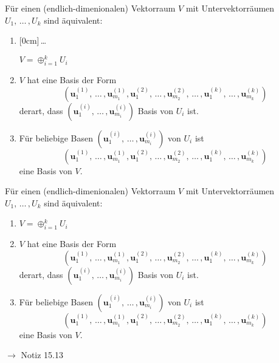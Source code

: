 \documentclass[11pt]{article}
\renewcommand{\cite}[1]{\par\bigskip\hfill{\color{gray}\tiny\(\to\) #1}}
\renewcommand{\vec}[1]{\mathbf{#1}}
\newcommand{\hide}[1]{\parbox{0cm}{\raisebox{-7pt}[0cm]{\dots}}\color{white}#1\color{black}}
\let\olddots\dots
\renewcommand{\dots}{\,\olddots\,}
\newenvironment{field}{}{\newpage}
\newif\ifnote
\newenvironment{note}{\notetrue}{\notefalse}
\newcommand{\localtag}{}
\newcommand{\globaltag}{}
\newcommand{\uuid}{}
\newcommand{\tags}[1]{
    \ifnote
        \renewcommand{\localtag}{#1}
    \else
        \renewcommand{\globaltag}{#1}
    \fi
    }
\newcommand{\xplain}[1]{\renewcommand{\uuid}{#1}}
\begin{document}
\begin{note}
    \tags{Satz}
    \xplain{36322b72-9b20-482b-bf70-882813cdb5db}

    \begin{field}
        \small
        Für einen (endlich-dimenionalen) Vektorraum $V$ mit Untervektorräumen $U_1,\dots,U_k$ sind äquivalent:
        \begin{enumerate}[(1)]
            \item \hide{$V = \oplus_{i=1}^k U_i$}
            \item $V$ hat eine Basis der Form \[(\vec{u}_1^{(1)},\dots,\vec{u}_{m_1}^{(1)},\vec{u}_1^{(2)},\dots,\vec{u}_{m_2}^{(2)},\dots,\vec{u}_1^{(k)},\dots,\vec{u}_{m_k}^{(k)})\]
            derart, dass $(\vec{u}_1^{(i)}, \dots, \vec{u}_{m_i}^{(i)})$ Basis von $U_i$ ist.
            \item Für beliebige Basen $(\vec{u}_1^{(i)}, \dots, \vec{u}_{m_i}^{(i)})$ von $U_i$ ist
             \[(\vec{u}_1^{(1)},\dots,\vec{u}_{m_1}^{(1)},\vec{u}_1^{(2)},\dots,\vec{u}_{m_2}^{(2)},\dots,\vec{u}_1^{(k)},\dots,\vec{u}_{m_k}^{(k)})\]
             eine Basis von $V$.
        \end{enumerate}
    \end{field}
    \begin{field}
        \small
        Für einen (endlich-dimenionalen) Vektorraum $V$ mit Untervektorräumen $U_1,\dots,U_k$ sind äquivalent:
        \begin{enumerate}[(1)]
            \item $V = \oplus_{i=1}^k U_i$
            \item $V$ hat eine Basis der Form \[(\vec{u}_1^{(1)},\dots,\vec{u}_{m_1}^{(1)},\vec{u}_1^{(2)},\dots,\vec{u}_{m_2}^{(2)},\dots,\vec{u}_1^{(k)},\dots,\vec{u}_{m_k}^{(k)})\]
            derart, dass $(\vec{u}_1^{(i)}, \dots, \vec{u}_{m_i}^{(i)})$ Basis von $U_i$ ist.
            \item Für beliebige Basen $(\vec{u}_1^{(i)}, \dots, \vec{u}_{m_i}^{(i)})$ von $U_i$ ist
             \[(\vec{u}_1^{(1)},\dots,\vec{u}_{m_1}^{(1)},\vec{u}_1^{(2)},\dots,\vec{u}_{m_2}^{(2)},\dots,\vec{u}_1^{(k)},\dots,\vec{u}_{m_k}^{(k)})\]
             eine Basis von $V$.
        \end{enumerate}
        \cite{Notiz 15.13}
    \end{field}


\end{note}
\end{document}
